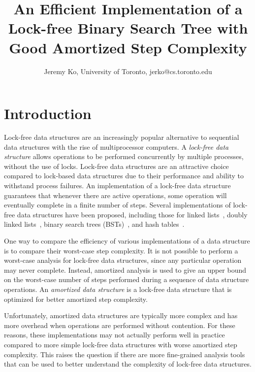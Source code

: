 \documentclass[letterpaper]{article}
\title{An Efficient Implementation of a Lock-free Binary Search Tree with Good Amortized Step Complexity}
\author{Jeremy Ko, University of Toronto, jerko@cs.toronto.edu}
\date{}
\begin{document}
\maketitle


\begin{abstract}


\end{abstract}


\section{Introduction}

Lock-free data structures are an increasingly popular alternative to sequential data structures with the rise of multiprocessor computers. A \textit{lock-free data structure} allows operations to be performed concurrently by multiple processes, without the use of locks. Lock-free data structures are an attractive choice compared to lock-based data structures due to their performance and ability to withstand process failures. An implementation of a lock-free data structure guarantees that whenever there are active operations, some operation will eventually complete in a finite number of steps. Several implementations of lock-free data structures have been proposed, including those for linked lists~\cite{Valois95, Harris01, FomitchevR04}, doubly linked lists~\cite{Shafiei15}, binary search trees (BSTs)~\cite{EllenFRB10, EllenFHR13, Ko18}, and hash tables~\cite{Michael02, ShalevS06, PurcellH05}.

One way to compare the efficiency of various implementations of a data structure is to compare their worst-case step complexity. It is not possible to perform a worst-case analysis for lock-free data structures, since any particular operation may never complete. Instead, amortized analysis is used to give an upper bound on the worst-case number of steps performed during a sequence of data structure operations. An \textit{amortized data structure} is a lock-free data structure that is optimized for better amortized step complexity.

Unfortunately, amortized data structures are typically more complex and has more overhead when operations are performed without contention. For these reasons, these implementations may not actually perform well in practice compared to more simple lock-free data structures with worse amortized step complexity. This raises the question if there are more fine-grained analysis tools that can be used to better understand the complexity of lock-free data structures.
\end{document}
